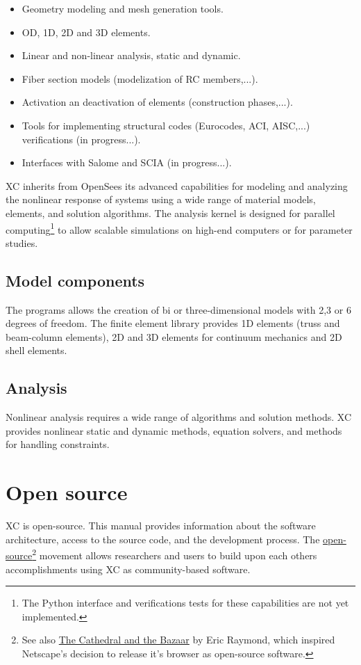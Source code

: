 \begin{itemize}
  \item Geometry modeling and mesh generation tools.
  \item OD, 1D, 2D and 3D elements.
  \item Linear and non-linear analysis, static and dynamic.
  \item Fiber section models (modelization of RC members,...).
  \item Activation an deactivation of elements (construction phases,...).
  \item Tools for implementing structural codes (Eurocodes, ACI, AISC,...) verifications (in progress...).
  \item Interfaces with Salome and SCIA (in progress...).
\end{itemize}

XC inherits from OpenSees its advanced capabilities for modeling and analyzing the nonlinear response of systems using a wide range of material models, elements, and solution algorithms. The analysis kernel is designed for parallel computing\footnote{The Python interface and verifications tests for these capabilities are not yet implemented.} to allow scalable simulations on high-end computers or for parameter studies.

\subsection{Model components}

The programs allows the creation of bi or three-dimensional models with 2,3 or 6 degrees of freedom. The finite element library provides 1D elements (truss and beam-column elements), 2D and 3D elements for continuum mechanics and 2D shell elements.

\subsection{Analysis}
Nonlinear analysis requires a wide range of algorithms and solution methods. XC provides nonlinear static and dynamic methods, equation solvers, and methods for handling constraints.

\section{Open source}
XC is open-source. This manual provides information about the software architecture, access to the source code, and the development process. The \href{https://opensource.org/}{open-source}\footnote{See also \href{http://www.unterstein.net/su/docs/CathBaz.pdf}{The Cathedral and the Bazaar} by Eric Raymond, which inspired Netscape's decision to release it's browser as open-source software.} movement allows researchers and users to build upon each others accomplishments using XC as community-based software.

